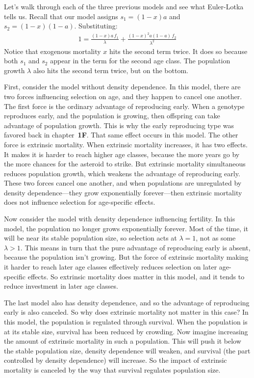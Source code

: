 \documentclass[10pt,reqno]{amsbook}
\newcommand{\bemph}[1]{{\textbf{\textcolor{bemphcol}{#1}}}}
\numberwithin{equation}{chapter}
\begin{document}
Let's walk through each of the three previous models and see what Euler-Lotka tells us. Recall that our model assigns $s_1 = (1-x)a$ and $s_2=(1-x)(1-a)$. Substituting:
\begin{align*}
	1 = \frac{ (1-x)a \, f_1}{\lambda} +  \frac{ (1-x)^{\!2} a (1-a) \, f_2}{\lambda^2}
\end{align*}
Notice that exogenous mortality $x$ hits the second term twice. It does so because both $s_1$ and $s_2$ appear in the term for the second age class. The population growth $\lambda$ also hits the second term twice, but on the bottom. 

First, consider the model without density dependence. In this model, there are two forces influencing selection on age, and they happen to cancel one another. The first force is the ordinary advantage of reproducing early. When a genotype reproduces early, and the population is growing, then offspring can take advantage of population growth. This is why the early reproducing type was favored back in chapter~\bemph{1F}. That same effect occurs in this model. The other force is extrinsic mortality. When extrinsic mortality increases, it has two effects. It makes it is harder to reach higher age classes, because the more years go by the more chances for the asteroid to strike. But extrinsic mortality simultaneous reduces population growth, which weakens the advantage of reproducing early. These two forces cancel one another, and when populations are unregulated by density dependence---they grow exponentially forever---then extrinsic mortality does not influence selection for age-specific effects.

Now consider the model with density dependence influencing fertility. In this model, the population no longer grows exponentially forever. Most of the time, it will be near its stable population size, so selection acts at $\lambda=1$, not as some $\lambda>1$. This means in turn that the pure advantage of reproducing early is absent, because the population isn't growing. But the force of extrinsic mortality making it harder to reach later age classes effectively reduces selection on later age-specific effects. So extrinsic mortality does matter in this model, and it tends to reduce investment in later age classes.

The last model also has density dependence, and so the advantage of reproducing early is also canceled. So why does extrinsic mortality not matter in this case? In this model, the population is regulated through survival. When the population is at its stable size, survival has been reduced by crowding. Now imagine increasing the amount of extrinsic mortality in such a population. This will push it below the stable population size, density dependence will weaken, and survival (the part controlled by density dependence) will increase. So the impact of extrinsic mortality is canceled by the way that survival regulates population size.
\end{document}
